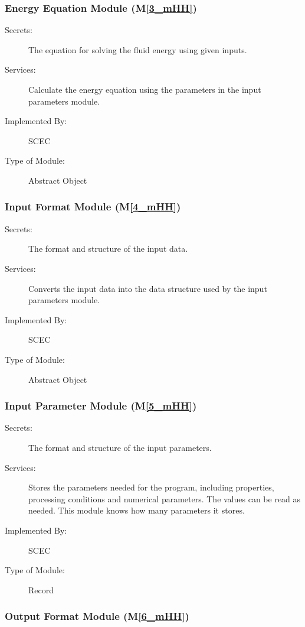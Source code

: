 \documentclass[12pt, titlepage]{article}
\newcommand{\mref}[1]{M\ref{#1}}
\begin{document}
\subsubsection{Energy Equation Module (\mref{3_mHH})}

\begin{description}
\item[Secrets:] The equation for solving the fluid energy using given inputs. 
\item[Services:] Calculate the energy equation using the parameters in the input parameters module.  
\item[Implemented By:] SCEC
\item[Type of Module:] Abstract Object
\end{description}


\subsubsection{Input Format Module (\mref{4_mHH})}

\begin{description}
\item[Secrets:]The format and structure of the input data.
\item[Services:]Converts the input data into the data structure used by the
  input parameters module.
\item[Implemented By:] SCEC
\item[Type of Module:] Abstract Object
\end{description}

\subsubsection{Input Parameter Module (\mref{5_mHH})}

\begin{description}
\item[Secrets:] The format and structure of the input parameters. 
\item[Services:] Stores the parameters needed for the program, including properties, processing conditions and numerical parameters. The values can be read as needed. This module knows how many parameters it stores. 
\item[Implemented By:] SCEC
\item[Type of Module:] Record
\end{description}

\subsubsection{Output Format Module (\mref{6_mHH})}
\end{document}
